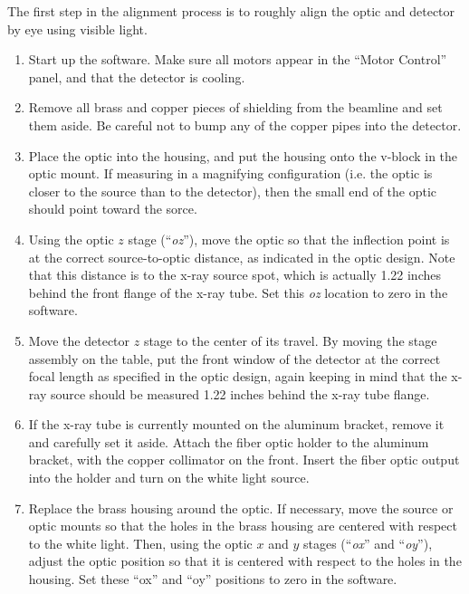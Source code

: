 The first step in the alignment process is to roughly align the optic and detector by eye using visible light.

\begin{enumerate}

\item Start up the software. Make sure all motors appear in the ``Motor Control'' panel, and that the detector is cooling. 

\item Remove all brass and copper pieces of shielding from the beamline and set them aside. Be careful not to bump any of the copper pipes into the detector.

\item Place the optic into the housing, and put the housing onto the v-block in the optic mount. If measuring in a magnifying configuration (i.e. the optic is closer to the source than to the detector), then the small end of the optic should point toward the sorce.

\item Using the optic $z$ stage (``\textit{oz}''), move the optic so that the inflection point is at the correct source-to-optic distance, as indicated in the optic design. Note that this distance is to the x-ray source spot, which is actually 1.22 inches behind the front flange of the x-ray tube\cite{tube_data_sheet}. Set this \textit{oz} location to zero in the software.

\item Move the detector $z$ stage to the center of its travel. By moving the stage assembly on the table, put the front window of the detector at the correct focal length as specified in the optic design, again keeping in mind that the x-ray source should be measured 1.22 inches behind the x-ray tube flange.

\item If the x-ray tube is currently mounted on the aluminum bracket, remove it and carefully set it aside. Attach the fiber optic holder to the aluminum bracket, with the copper collimator on the front. Insert the fiber optic output into the holder and turn on the white light source.

\item Replace the brass housing around the optic. If necessary, move the source or optic mounts so that the holes in the brass housing are centered with respect to the white light. Then, using the optic $x$ and $y$ stages (``\textit{ox}'' and ``\textit{oy}''), adjust the optic position so that it is centered with respect to the holes in the housing. Set these ``ox'' and ``oy'' positions to zero in the software.


\end{enumerate}

